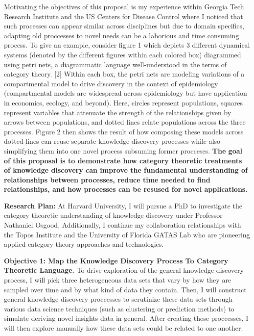 \documentclass[11pt]{extarticle}
\begin{document}
Motivating the objectives of this proposal is my experience within Georgia Tech Research Institute and the US Centers for Disease Control where I noticed that such processes can appear similar across disciplines but due to domain specifics, adapting old proccesses to novel needs can be a laborious and time consuming process. 
To give an example, consider figure 1 which depicts 3 different dynamical systems (denoted by the different figures within each colored box) diagrammed using petri nets, a diagrammatic language well-understood in the terms of category theory. [2]
Within each box, the petri nets are modeling variations of a compartmental model to drive discovery in the context of epidemiology (compartmental models are widespread across epidemiology but have application in economics, ecology, and beyond). 
Here, circles represent populations, squares represent variables that attenuate the strength of the relationships given by arrows between populations, and dotted lines relate populations across the three processes.
Figure 2 then shows the result of how composing these models across dotted lines can reuse separate knowledge discovery processes while also simplifying them into one novel process subsuming former procceses.
\textbf{The goal of this proposal is to demonstrate how category theoretic treatments of knowledge discovery can improve the fundamental understanding of relationships between processes, reduce time needed to find relationships, and how processes can be resused for novel applications.}

\textbf{Research Plan:} At Harvard University, I will pursue a PhD to investigate the category theoretic understanding of knowledge discovery under Professor Nathaniel Osgood.
Additionally, I continue my collaboration relationships with the Topos Institute and the University of Florida GATAS Lab who are pioneering applied category theory approaches and technologies.

\textbf{Objective 1: Map the Knowledge Discovery Process To Category Theoretic Language.} To drive exploration of the general knowledge discovery process, I will pick three heterogeneous data sets that vary by how they are sampled over time and by what kind of data they contain. 
Then, I will construct general knowledge discovery proccesses to scrutinize these data sets through various data science techniques (such as clustering or prediction methods) to simulate deriving novel insights data in general.
After creating these proccesses, I will then explore manually how these data sets could be related to one another.
\end{document}

